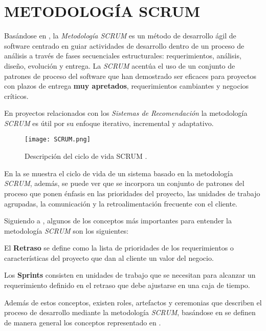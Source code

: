 \section{METODOLOGÍA SCRUM}

Basándose en \parencite{pressman2010ingenieria}, la \textit{Metodología SCRUM} es un método de desarrollo ágil de software centrado en guiar actividades de desarrollo dentro de un proceso de análisis a través de fases secuenciales estructurales: requerimientos, análisis, diseño, evolución y entrega. La \textit{SCRUM} acentúa el uso de un conjunto de patrones de proceso del software que han demostrado ser eficaces para proyectos con plazos de entrega \textbf{muy apretados}, requerimientos cambiantes y negocios críticos. 

En proyectos relacionados con los \textit{Sistemas de Recomendación} la metodología \textit{SCRUM} es útil por su enfoque iterativo, incremental y adaptativo.

\begin{figure}[h!]
    \centering
    \texttt{[image: SCRUM.png]}
    \caption{Descripción del ciclo de vida SCRUM \parencite{pressman2010ingenieria}.}
    \label{fig:SCRUM}
\end{figure}

En la  se muestra el ciclo de vida de un sistema basado en la metodología \textit{SCRUM}, además, se puede ver que se incorpora un conjunto de patrones del proceso que ponen énfasis en las prioridades del proyecto, las unidades de trabajo agrupadas, la comunicación y la retroalimentación frecuente con el cliente.

Siguiendo a \parencite{pressman2010ingenieria}, algunos de los conceptos más importantes para entender la metodología \textit{SCRUM} son los siguientes: 

\newpage

\begin{definition}
    El \textbf{Retraso} se define como la lista de prioridades de los requerimientos o características del proyecto que dan al cliente un valor del negocio.
\end{definition}

\begin{definition}
    Los \textbf{Sprints} consisten en unidades de trabajo que se necesitan para alcanzar un requerimiento definido en el retraso que debe ajustarse en una caja de tiempo.
\end{definition}

Además de estos conceptos, existen roles, artefactos y ceremonias que describen el proceso de desarrollo mediante la metodología \textit{SCRUM}, basándose en \parencite{sachdeva2016scrum} se definen de manera general los conceptos representado en .

